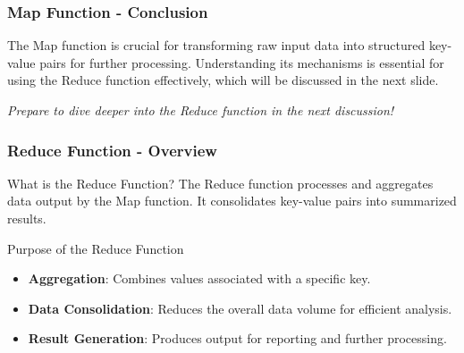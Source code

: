 \documentclass[aspectratio=169]{beamer}
\begin{document}
\begin{frame}[fragile]
    \frametitle{Map Function - Conclusion}
    The Map function is crucial for transforming raw input data into structured 
    key-value pairs for further processing. Understanding its mechanisms is essential 
    for using the Reduce function effectively, which will be discussed in the next slide.

    \textit{Prepare to dive deeper into the Reduce function in the next discussion!}
\end{frame}

\begin{frame}[fragile]
    \frametitle{Reduce Function - Overview}
    \begin{block}{What is the Reduce Function?}
        The Reduce function processes and aggregates data output by the Map function. It consolidates key-value pairs into summarized results.
    \end{block}
    
    \begin{block}{Purpose of the Reduce Function}
        \begin{itemize}
            \item \textbf{Aggregation}: Combines values associated with a specific key.
            \item \textbf{Data Consolidation}: Reduces the overall data volume for efficient analysis.
            \item \textbf{Result Generation}: Produces output for reporting and further processing.
        \end{itemize}
    \end{block}
\end{frame}
\end{document}
